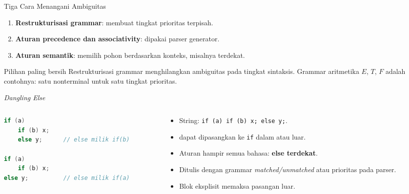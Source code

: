 \documentclass[aspectratio=169,10pt,t]{beamer}
\begin{document}
\begin{frame}{Tiga Cara Menangani Ambiguitas}
  \begin{enumerate}
    \setlength{\itemsep}{4pt}
    \item \textbf{Restrukturisasi grammar}: membuat tingkat prioritas
          terpisah.
    \item \textbf{Aturan precedence dan associativity}: dipakai parser
          generator.
    \item \textbf{Aturan semantik}: memilih pohon berdasarkan konteks,
          misalnya  terdekat.
  \end{enumerate}

  \vspace{6pt}
  \begin{block}{Pilihan paling bersih}
    \footnotesize
    Restrukturisasi grammar menghilangkan ambiguitas pada tingkat
    sintaksis. Grammar aritmetika \(E\), \(T\), \(F\) adalah contohnya:
    satu nonterminal untuk satu tingkat prioritas.
  \end{block}
\end{frame}

\begin{frame}[fragile]{\textit{Dangling Else}}
  \begin{columns}[T,onlytextwidth]
    \begin{column}{0.48\textwidth}
      \begin{lstlisting}[language=C,numbers=none,
        caption={Dua kemungkinan pemasangan \texttt{else}}]
if (a)
    if (b) x;
    else y;      // else milik if(b)

if (a)
    if (b) x;
else y;          // else milik if(a)
      \end{lstlisting}
    \end{column}
    \begin{column}{0.48\textwidth}
      \begin{itemize}
        \item String: \texttt{if (a) if (b) x; else y;}.
        \item {} dapat dipasangkan ke \texttt{if} dalam atau
              luar.
        \item Aturan hampir semua bahasa: \textbf{else terdekat}.
        \item Ditulis dengan grammar \textit{matched/unmatched} atau
              prioritas  pada parser.
        \item Blok eksplisit memaksa pasangan luar.
      \end{itemize}
    \end{column}
  \end{columns}
\end{frame}
\end{document}
